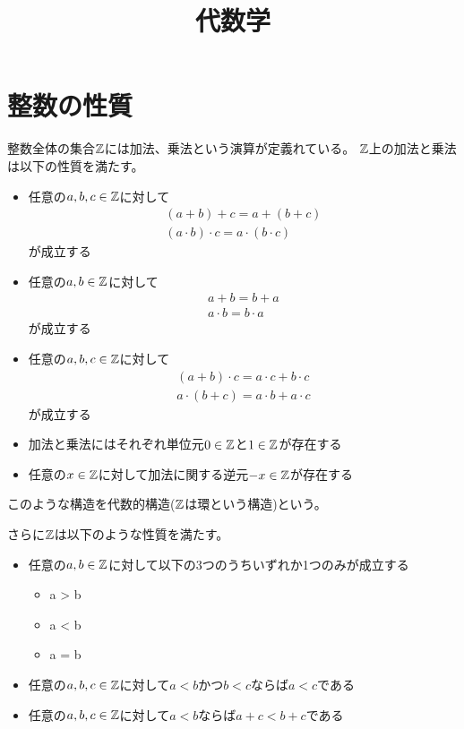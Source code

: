 \documentclass[uplatex, 11pt, a4j, dvipdfmx]{jsarticle}
\title{代数学}
\author{}
\date{}
\begin{document}
\maketitle

\section{整数の性質}
  整数全体の集合$\mathbb{Z}$には加法、乗法という演算が定義れている。
  $\mathbb{Z}$上の加法と乗法は以下の性質を満たす。
  \begin{itemize}
    \item 任意の$a, b, c \in \mathbb{Z}$に対して
          \begin{equation} \begin{gathered}
            ( a + b ) + c = a + ( b + c ) \\
            ( a \cdot b ) \cdot c = a \cdot ( b \cdot c )
          \end{gathered} \end{equation}
          が成立する
    \item 任意の$a, b \in \mathbb{Z}$に対して
          \begin{equation} \begin{gathered}
            a + b = b + a \\
            a \cdot b = b \cdot a
          \end{gathered} \end{equation}
          が成立する
    \item 任意の$a, b, c \in \mathbb{Z}$に対して
          \begin{equation} \begin{gathered}
            ( a + b ) \cdot c = a \cdot c + b \cdot c \\
            a \cdot ( b + c ) = a \cdot b + a \cdot c
          \end{gathered} \end{equation}
          が成立する
    \item 加法と乗法にはそれぞれ単位元$0 \in \mathbb{Z}$と$1 \in \mathbb{Z}$が存在する
    \item 任意の$x \in \mathbb{Z}$に対して加法に関する逆元$-x \in \mathbb{Z}$が存在する
  \end{itemize}

  このような構造を代数的構造($\mathbb{Z}$は環という構造)という。

  さらに$\mathbb{Z}$は以下のような性質を満たす。
  \begin{itemize}
    \item 任意の$a, b \in \mathbb{Z}$に対して以下の3つのうちいずれか1つのみが成立する
      \begin{itemize}
        \item a > b
        \item a < b
        \item a = b
      \end{itemize}
    \item 任意の$a, b, c \in \mathbb{Z}$に対して$a < b$かつ$b < c$ならば$a < c$である
    \item 任意の$a, b, c \in \mathbb{Z}$に対して$a < b$ならば$a + c < b + c$である
  \end{itemize}
\end{document}
